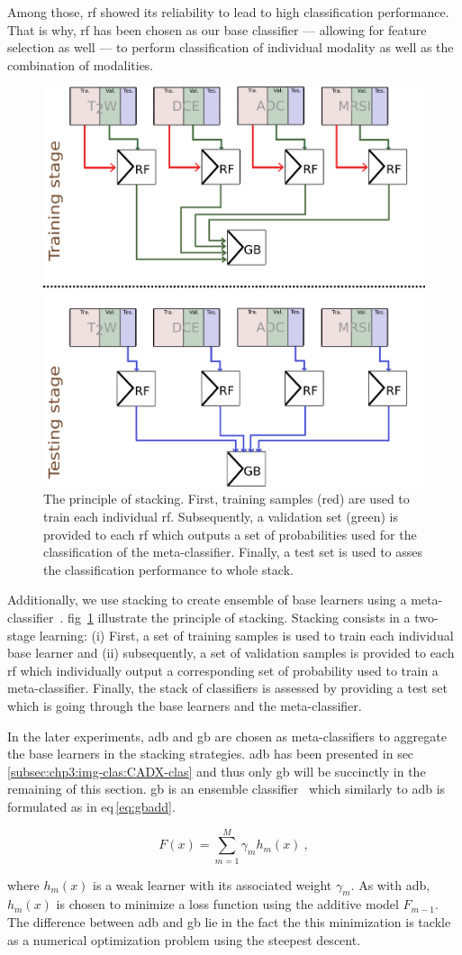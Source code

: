 Among those, \ac{rf} showed its reliability to lead to high classification performance.
That is why, \ac{rf} has been chosen as our base classifier --- allowing for feature selection as well --- to perform classification of individual modality as well as the combination of modalities.

\begin{figure}
  \centering
  \includegraphics[width=0.5\linewidth]{content/figures/stacking_gb.png}
  \caption[The principle of stacking.]{The principle of stacking. First, training samples (red) are used to train each individual \ac{rf}. Subsequently, a validation set (green) is provided to each \ac{rf} which outputs a set of probabilities used for the classification of the meta-classifier. Finally, a test set is used to asses the classification performance to whole stack.}
  \label{fig:stacking}
\end{figure}

Additionally, we use stacking to create ensemble of base learners using a meta-classifier~\cite{wolpert1992stacked}.
\Acl{fig}~\ref{fig:stacking} illustrate the principle of stacking.
Stacking consists in a two-stage learning:
(i) First, a set of training samples is used to train each individual base learner and
(ii) subsequently, a set of validation samples is provided to each \ac{rf} which individually output a corresponding set of probability used to train a meta-classifier.
Finally, the stack of classifiers is assessed by providing a test set which is going through the base learners and the meta-classifier.

In the later experiments, \ac{adb} and \ac{gb} are chosen as meta-classifiers to aggregate the base learners in the stacking strategies.
\ac{adb} has been presented in \acs{sec}\,\ref{subsec:chp3:img-clas:CADX-clas} and thus only \ac{gb} will be succinctly in the remaining of this section.
\ac{gb} is an ensemble classifier~\cite{friedman2001greedy} which similarly to \ac{adb} is formulated as in \acs{eq}\,\eqref{eq:gbadd}.

\begin{equation}
  F(x) = \sum_{m=1}^{M} \gamma_{m} h_m(x) \ ,
  \label{eq:gbadd}
\end{equation}

\noindent where $h_m(x)$ is a weak learner with its associated weight $\gamma_m$.
As with \ac{adb}, $h_m(x)$ is chosen to minimize a loss function using the additive model $F_{m-1}$.
The difference between \ac{adb} and \ac{gb} lie in the fact the this minimization is tackle as a numerical optimization problem using the steepest descent.
